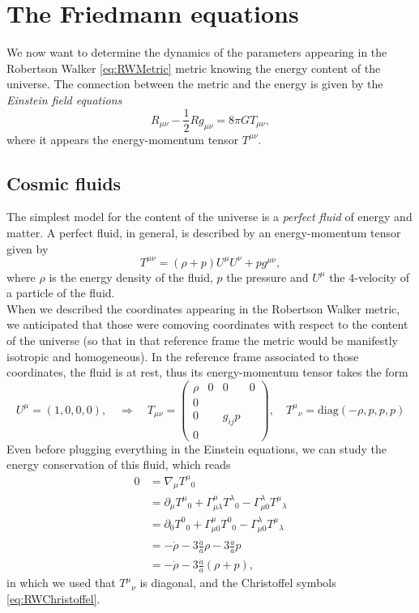 \section{The Friedmann equations}
We now want to determine the dynamics of the parameters appearing in the Robertson Walker \eqref{eq:RWMetric} metric knowing the energy content of the universe. The connection between the metric and the energy is given by the \emph{Einstein field equations}
\begin{equation}\label{eq:EFE}
    R_{\mu\nu}-\frac{1}{2}Rg_{\mu\nu}=8\pi GT_{\mu\nu},
\end{equation}
where it appears the energy-momentum tensor $T^{\mu\nu}$.
\subsection{Cosmic fluids}
The simplest model for the content of the universe is a \emph{perfect fluid} of energy and matter. A perfect fluid, in general, is described by an energy-momentum tensor given by
\begin{equation}\label{eq:PerfectFluidEMTensor}
    T^{\mu\nu}=(\rho+p)U^\mu U^\nu+pg^{\mu\nu},
\end{equation}
where $\rho$ is the energy density of the fluid, $p$ the pressure and $U^\mu$ the $4$-velocity of a particle of the fluid.\\When we described the coordinates appearing in the Robertson Walker metric, we anticipated that those were comoving coordinates with respect to the content of the universe (so that in that reference frame the metric would be manifestly isotropic and homogeneous). In the reference frame associated to those coordinates, the fluid is at rest, thus its energy-momentum tensor takes the form
\begin{equation}
    U^\mu=(1,0,0,0),\quad\Rightarrow\quad
    T_{\mu\nu}=\begin{pmatrix}
        \rho&0&0&0\\
        0&&&\\
        0&&g_{ij}p&\\
        0&&&
    \end{pmatrix},
    \quad T^\mu\phantom{} _\nu=\text{diag}(-\rho,p,p,p)\label{eq:EMTensorCosmicFluid}
\end{equation}
Even before plugging everything in the Einstein equations, we can study the energy conservation of this fluid, which reads
\begin{align}\label{eq:ConservationEnergy}
    0&=\nabla_\mu T^\mu\phantom{} _0\nonumber\\&=\partial_\mu T^\mu\phantom{} _0+\Gamma^\mu_{\mu\lambda}T^\lambda\phantom{} _0-\Gamma^\lambda_{\mu0}T^\mu\phantom{} _\lambda\nonumber\\
    &=\partial_0 T^0\phantom{} _0+\Gamma^\mu_{\mu0}T^0\phantom{} _0-\Gamma^\lambda_{\mu0}T^\mu\phantom{} _\lambda\nonumber\\
    &=-\dot\rho-3\frac{\dot a}{a}\rho-3\frac{\dot a}{a}p\nonumber\\
    &=-\dot\rho-3\frac{\dot a}{a}(\rho+p),
\end{align}
in which we used that $T^\mu\phantom{}_\nu$ is diagonal, and the Christoffel symbols \eqref{eq:RWChristoffel}.

